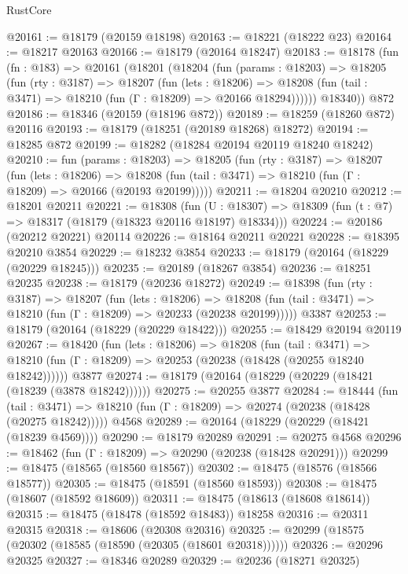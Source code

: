 \begin{lexlean}{RustCore}
\begin{coremodule}
@20161 := @18179 (@20159 @18198)
@20163 := @18221 (@18222 @23)
@20164 := @18217 @20163
@20166 := @18179 (@20164 @18247)
@20183 := @18178
    (fun (fn : @183) =>
    @20161
      (@18201
        (@18204
          (fun (params : @18203) =>
          @18205
            (fun (rty : @3187) =>
            @18207
              (fun (lets : @18206) =>
              @18208 (fun (tail : @3471) => @18210 (fun (Γ : @18209) => @20166 @18294))))))
        @18340))
    @872
@20186 := @18346 (@20159 (@18196 @872))
@20189 := @18259 (@18260 @872) @20116
@20193 := @18179 (@18251 (@20189 @18268) @18272)
@20194 := @18285 @872
@20199 := @18282 (@18284 @20194 @20119 @18240 @18242)
@20210 := fun (params : @18203) =>
  @18205
    (fun (rty : @3187) =>
    @18207
      (fun (lets : @18206) =>
      @18208 (fun (tail : @3471) => @18210 (fun (Γ : @18209) => @20166 (@20193 @20199)))))
@20211 := @18204 @20210
@20212 := @18201 @20211
@20221 := @18308
    (fun (U : @18307) => @18309 (fun (t : @7) => @18317 (@18179 (@18323 @20116 @18197) @18334)))
@20224 := @20186 (@20212 @20221) @20114
@20226 := @18164 @20211 @20221
@20228 := @18395 @20210 @3854
@20229 := @18232 @3854
@20233 := @18179 (@20164 (@18229 (@20229 @18245)))
@20235 := @20189 (@18267 @3854)
@20236 := @18251 @20235
@20238 := @18179 (@20236 @18272)
@20249 := @18398
    (fun (rty : @3187) =>
    @18207
      (fun (lets : @18206) =>
      @18208 (fun (tail : @3471) => @18210 (fun (Γ : @18209) => @20233 (@20238 @20199)))))
    @3387
@20253 := @18179 (@20164 (@18229 (@20229 @18422)))
@20255 := @18429 @20194 @20119
@20267 := @18420
    (fun (lets : @18206) =>
    @18208
      (fun (tail : @3471) =>
      @18210 (fun (Γ : @18209) => @20253 (@20238 (@18428 (@20255 @18240 @18242))))))
    @3877
@20274 := @18179 (@20164 (@18229 (@20229 (@18421 (@18239 (@3878 @18242))))))
@20275 := @20255 @3877
@20284 := @18444
    (fun (tail : @3471) => @18210 (fun (Γ : @18209) => @20274 (@20238 (@18428 (@20275 @18242)))))
    @4568
@20289 := @20164 (@18229 (@20229 (@18421 (@18239 @4569))))
@20290 := @18179 @20289
@20291 := @20275 @4568
@20296 := @18462 (fun (Γ : @18209) => @20290 (@20238 (@18428 @20291)))
@20299 := @18475 (@18565 (@18560 @18567))
@20302 := @18475 (@18576 (@18566 @18577))
@20305 := @18475 (@18591 (@18560 @18593))
@20308 := @18475 (@18607 (@18592 @18609))
@20311 := @18475 (@18613 (@18608 @18614))
@20315 := @18475 (@18478 (@18592 @18483)) @18258
@20316 := @20311 @20315
@20318 := @18606 (@20308 @20316)
@20325 := @20299 (@18575 (@20302 (@18585 (@18590 (@20305 (@18601 @20318))))))
@20326 := @20296 @20325
@20327 := @18346 @20289
@20329 := @20236 (@18271 @20325)

\end{coremodule}
\end{lexlean}
